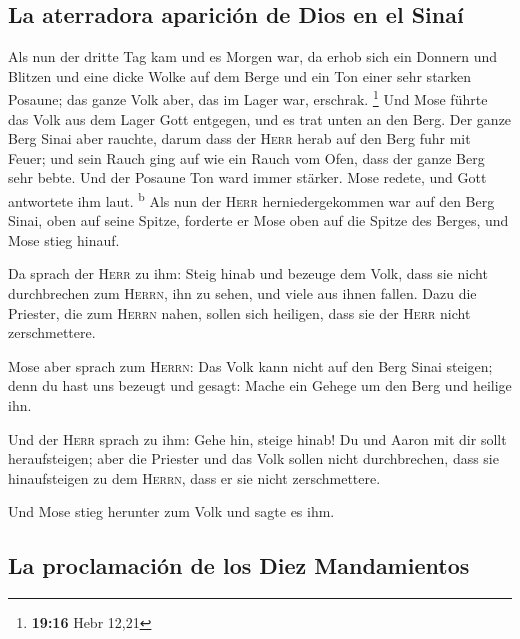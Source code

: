 \hypertarget{la-aterradora-apariciuxf3n-de-dios-en-el-sinauxed}{%
\subsection{La aterradora aparición de Dios en el
Sinaí}\label{la-aterradora-apariciuxf3n-de-dios-en-el-sinauxed}}

 Als nun der dritte Tag kam und es Morgen war, da erhob
sich ein Donnern und Blitzen und eine dicke Wolke auf dem Berge und ein
Ton einer sehr starken Posaune; das ganze Volk aber, das im Lager war,
erschrak. \footnote{\textbf{19:16} Hebr 12,21}  Und Mose
führte das Volk aus dem Lager Gott entgegen, und es trat unten an den
Berg.  Der ganze Berg Sinai aber rauchte, darum dass der
\textsc{Herr} herab auf den Berg fuhr mit Feuer; und sein Rauch ging auf
wie ein Rauch vom Ofen, dass der ganze Berg sehr bebte. 
Und der Posaune Ton ward immer stärker. Mose redete, und Gott antwortete
ihm laut. \textsuperscript{b}  Als nun der \textsc{Herr}
herniedergekommen war auf den Berg Sinai, oben auf seine Spitze,
forderte er Mose oben auf die Spitze des Berges, und Mose stieg hinauf.

 Da sprach der \textsc{Herr} zu ihm: Steig hinab und
bezeuge dem Volk, dass sie nicht durchbrechen zum \textsc{Herrn}, ihn zu
sehen, und viele aus ihnen fallen.  Dazu die Priester,
die zum \textsc{Herrn} nahen, sollen sich heiligen, dass sie der
\textsc{Herr} nicht zerschmettere.

 Mose aber sprach zum \textsc{Herrn}: Das Volk kann nicht
auf den Berg Sinai steigen; denn du hast uns bezeugt und gesagt: Mache
ein Gehege um den Berg und heilige ihn.

 Und der \textsc{Herr} sprach zu ihm: Gehe hin, steige
hinab! Du und Aaron mit dir sollt heraufsteigen; aber die Priester und
das Volk sollen nicht durchbrechen, dass sie hinaufsteigen zu dem
\textsc{Herrn}, dass er sie nicht zerschmettere.

 Und Mose stieg herunter zum Volk und sagte es ihm.

\hypertarget{la-proclamaciuxf3n-de-los-diez-mandamientos}{%
\subsection{La proclamación de los Diez
Mandamientos}\label{la-proclamaciuxf3n-de-los-diez-mandamientos}}

